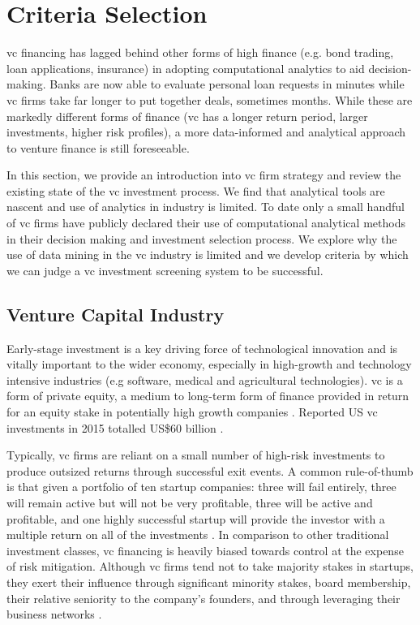 \documentclass[../thesis/thesis.tex]{subfiles}
\begin{document}
\section{Criteria Selection}

\Gls{vc} financing has lagged behind other forms of high finance (e.g. bond trading, loan applications, insurance) in adopting computational analytics to aid decision-making. Banks are now able to evaluate personal loan requests in minutes while \gls{vc} firms take far longer to put together deals, sometimes months. While these are markedly different forms of finance (\gls{vc} has a longer return period, larger investments, higher risk profiles), a more data-informed and analytical approach to venture finance is still foreseeable.

In this section, we provide an introduction into \gls{vc} firm strategy and review the existing state of the \gls{vc} investment process. We find that analytical tools are nascent and use of analytics in industry is limited. To date only a small handful of \gls{vc} firms have publicly declared their use of computational analytical methods in their decision making and investment selection process. We explore why the use of data mining in the \gls{vc} industry is limited and we develop criteria by which we can judge a \gls{vc} investment screening system to be successful.

\subsection{Venture Capital Industry}

Early-stage investment is a key driving force of technological innovation and is vitally important to the wider economy, especially in high-growth and technology intensive industries (e.g software, medical and agricultural technologies). \Gls{vc} is a form of private equity, a medium to long-term form of finance provided in return for an equity stake in potentially high growth companies \cite{nvca2016}. Reported US \gls{vc} investments in 2015 totalled US\$60 billion \cite{nvca2016}.

Typically, \gls{vc} firms are reliant on a small number of high-risk investments to produce outsized returns through successful exit events. A common rule-of-thumb is that given a portfolio of ten startup companies: three will fail entirely, three will remain active but will not be very profitable, three will be active and profitable, and one highly successful startup will provide the investor with a multiple return on all of the investments \cite{stone2014}. In comparison to other traditional investment classes, \gls{vc} financing is heavily biased towards control at the expense of risk mitigation. Although \gls{vc} firms tend not to take majority stakes in startups, they exert their influence through significant minority stakes, board membership, their relative seniority to the company's founders, and through leveraging their business networks \cite{fried2006}.
\end{document}
